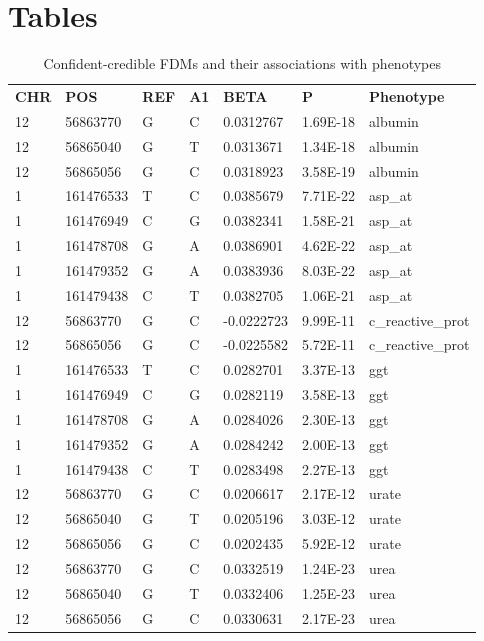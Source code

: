 \section{Tables}
\begin{table}[htb]
\begin{tabular}{lllllll}
\textbf{CHR} & \textbf{POS} & \textbf{REF} & \textbf{A1} & \textbf{BETA} & \textbf{P} & \textbf{Phenotype} \\
12 & 56863770  & G & C & 0.0312767  & 1.69E-18 & albumin           \\
12 & 56865040  & G & T & 0.0313671  & 1.34E-18 & albumin           \\
12 & 56865056  & G & C & 0.0318923  & 3.58E-19 & albumin           \\
1  & 161476533 & T & C & 0.0385679  & 7.71E-22 & asp\_at           \\
1  & 161476949 & C & G & 0.0382341  & 1.58E-21 & asp\_at           \\
1  & 161478708 & G & A & 0.0386901  & 4.62E-22 & asp\_at           \\
1  & 161479352 & G & A & 0.0383936  & 8.03E-22 & asp\_at           \\
1  & 161479438 & C & T & 0.0382705  & 1.06E-21 & asp\_at           \\
12 & 56863770  & G & C & -0.0222723 & 9.99E-11 & c\_reactive\_prot \\
12 & 56865056  & G & C & -0.0225582 & 5.72E-11 & c\_reactive\_prot \\
1  & 161476533 & T & C & 0.0282701  & 3.37E-13 & ggt               \\
1  & 161476949 & C & G & 0.0282119  & 3.58E-13 & ggt               \\
1  & 161478708 & G & A & 0.0284026  & 2.30E-13 & ggt               \\
1  & 161479352 & G & A & 0.0284242  & 2.00E-13 & ggt               \\
1  & 161479438 & C & T & 0.0283498  & 2.27E-13 & ggt               \\
12 & 56863770  & G & C & 0.0206617  & 2.17E-12 & urate             \\
12 & 56865040  & G & T & 0.0205196  & 3.03E-12 & urate             \\
12 & 56865056  & G & C & 0.0202435  & 5.92E-12 & urate             \\
12 & 56863770  & G & C & 0.0332519  & 1.24E-23 & urea              \\
12 & 56865040  & G & T & 0.0332406  & 1.25E-23 & urea              \\
12 & 56865056  & G & C & 0.0330631  & 2.17E-23 & urea             
\end{tabular}
\caption{Confident-credible FDMs and their associations with phenotypes}
\label{tab:4.1}
\end{table}

